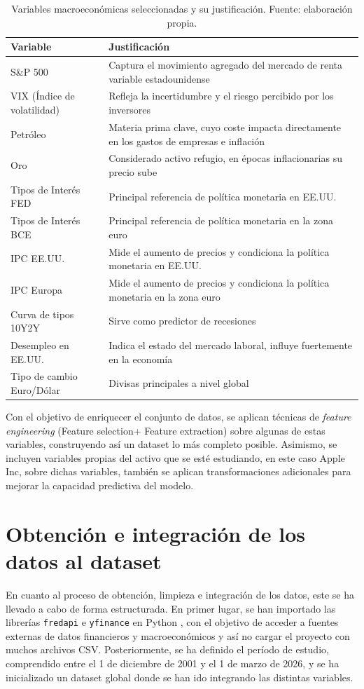 \begin{table}[H]
\centering
\begin{tabular}{|p{4cm}|p{10cm}|}
\hline
\textbf{Variable} & \textbf{Justificación} \\
\hline
S\&P 500 & Captura el movimiento agregado del mercado de renta variable estadounidense \\
\hline
VIX (Índice de volatilidad) & Refleja la incertidumbre y el riesgo percibido por los inversores \\
\hline
Petróleo & Materia prima clave, cuyo coste impacta directamente en los gastos de empresas e inflación \\
\hline
Oro & Considerado activo refugio, en épocas inflacionarias su precio sube \\
\hline
Tipos de Interés FED \cite{fed} & Principal referencia de política monetaria en EE.UU. \\
\hline
Tipos de Interés BCE \cite{bce} & Principal referencia de política monetaria en la zona euro \\
\hline
IPC EE.UU. \cite{ipc} & Mide el aumento de precios y condiciona la política monetaria en EE.UU. \\
\hline
IPC Europa \cite{ipc} & Mide el aumento de precios y condiciona la política monetaria en la zona euro \\
\hline
Curva de tipos 10Y2Y & Sirve como predictor de recesiones \\
\hline
Desempleo en EE.UU. & Indica el estado del mercado laboral, influye fuertemente en la economía \\
\hline
Tipo de cambio Euro/Dólar & Divisas principales a nivel global \\
\hline
\end{tabular}
\label{tab:variables_macro}
\caption{Variables macroeconómicas seleccionadas y su justificación. Fuente: elaboración propia.}
\end{table}

Con el objetivo de enriquecer el conjunto de datos, se aplican técnicas de \emph{feature engineering} (Feature selection+ Feature extraction) sobre algunas de estas variables, construyendo así un dataset lo más completo posible. Asimismo, se incluyen variables propias del activo que se esté estudiando, en este caso Apple Inc, sobre dichas variables, también se aplican transformaciones adicionales para mejorar la capacidad predictiva del modelo.

\section{Obtención e integración de los datos al dataset}
En cuanto al proceso de obtención, limpieza e integración de los datos, este se ha llevado a cabo de forma estructurada. En primer lugar, se han importado las librerías \texttt{fredapi} \cite{fredapi} e \texttt{yfinance} \cite{yfinance} en Python \cite{python_docs}, con el objetivo de acceder a fuentes externas de datos financieros y macroeconómicos y así no cargar el proyecto con muchos archivos CSV. Posteriormente, se ha definido el período de estudio, comprendido entre el 1 de diciembre de 2001 y el 1 de marzo de 2026, y se ha inicializado un dataset global donde se han ido integrando las distintas variables.

